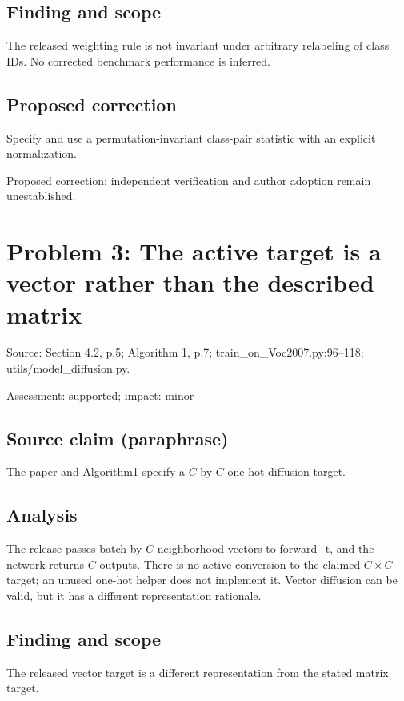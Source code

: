 \documentclass[11pt]{article}
\begin{document}
\subsection*{Finding and scope}

The released weighting rule is not invariant under arbitrary relabeling of class IDs. No corrected benchmark performance is inferred.

\subsection*{Proposed correction}

Specify and use a permutation-invariant class-pair statistic with an explicit normalization.

Proposed correction; independent verification and author adoption remain unestablished.

\section*{Problem 3: The active target is a vector rather than the described matrix}

Source: Section 4.2, p.5; Algorithm 1, p.7; train\_on\_Voc2007.py:96–118; utils/model\_diffusion.py.

Assessment: supported; impact: minor

\subsection*{Source claim (paraphrase)}

The paper and Algorithm1 specify a \(C\)-by-\(C\) one-hot diffusion target.

\subsection*{Analysis}

The release passes batch-by-\(C\) neighborhood vectors to forward\_t, and the network returns \(C\) outputs. There is no active conversion to the claimed \(C\times C\) target; an unused one-hot helper does not implement it. Vector diffusion can be valid, but it has a different representation rationale.

\subsection*{Finding and scope}

The released vector target is a different representation from the stated matrix target.
\end{document}
